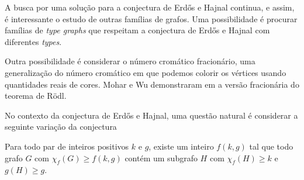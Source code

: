
A busca por uma solução para a conjectura de Erd\H{o}s e Hajnal continua, e assim, é interessante o estudo de outras famílias de grafos. Uma possibilidade é procurar famílias de \textit{type graphs} que respeitam a conjectura de Erd\H{o}s e Hajnal com diferentes \textit{types}.

Outra possibilidade é considerar o número cromático fracionário, uma generalização do número cromático em que podemos colorir os vértices usando quantidades reais de cores. Mohar e Wu demonstraram em \cite{mohar2015triangle} a versão fracionária do teorema de R\"{o}dl.

No contexto da conjectura de Erd\H{o}s e Hajnal, uma questão natural é considerar a seguinte variação da conjectura

\begin{conjectura}
Para todo par de inteiros positivos $k$ e $g$, existe um inteiro $f(k,g)$ tal que todo grafo $G$ com $\chi_f(G) \geq f(k,g)$ contém um subgrafo $H$ com $\chi_f(H)\geq k$ e $g(H) \geq g$.
\end{conjectura}